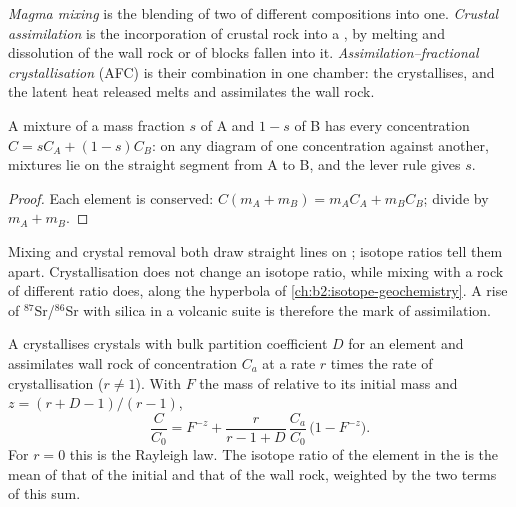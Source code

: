 \begin{definition}
\label{def:b2:magmatic-differentiation:open}
\emph{Magma mixing} is the blending of two  of different
compositions into one. \emph{Crustal assimilation} is the
incorporation of crustal rock into a , by melting and dissolution of the wall
rock or of blocks fallen into it. \emph{Assimilation--fractional
crystallisation} (AFC) is their
combination in one chamber: the  crystallises, and the latent heat released
melts and assimilates the wall rock.
\end{definition}

\begin{proposition}\label{prop:b2:magmatic-differentiation:mixing}
A mixture of a mass fraction $s$ of  A and $1-s$ of  B has every
concentration $C = sC_A + (1-s)C_B$: on any diagram of one concentration against
another, mixtures lie on the straight segment from A to B, and the lever rule gives
$s$.
\end{proposition}

\begin{proof}
Each element is conserved: $C(m_A + m_B) = m_AC_A + m_BC_B$; divide by $m_A + m_B$.
\end{proof}

Mixing and crystal removal both draw straight lines on ; isotope
ratios tell them apart. Crystallisation does not change an isotope ratio, while
mixing with a rock of different ratio does, along the hyperbola of
\cref{ch:b2:isotope-geochemistry}. A rise of $^{87}$Sr/$^{86}$Sr with silica in a
volcanic suite is therefore the mark of assimilation.

\begin{proposition}
\label{prop:b2:magmatic-differentiation:afc}
A  crystallises crystals with bulk partition coefficient $D$ for an element
and assimilates wall rock of concentration $C_a$ at a rate $r$ times the rate of
crystallisation ($r \ne 1$). With $F$ the mass of  relative to its initial
mass and $z = (r + D - 1)/(r - 1)$,
\[
\frac{C}{C_0} = F^{-z} + \frac{r}{r - 1 + D}\,\frac{C_a}{C_0}\,\bigl(1 - F^{-z}\bigr).
\]
For $r = 0$ this is the Rayleigh law. The isotope ratio of the element in the 
is the mean of that of the initial  and that of the wall rock, weighted by the
two terms of this sum.
\end{proposition}


